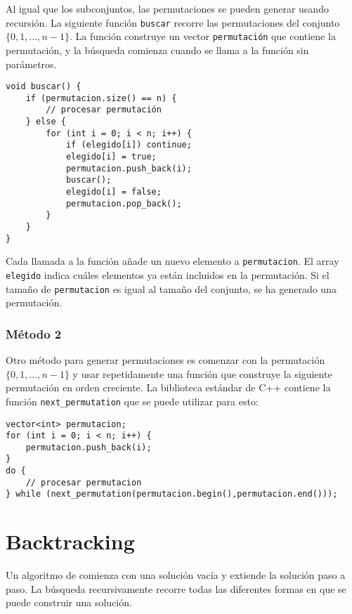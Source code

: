 Al igual que los subconjuntos, las permutaciones se pueden generar
usando recursión.
La siguiente función \texttt{buscar} recorre
las permutaciones del conjunto $\{0,1,\ldots,n-1\}$.
La función construye un vector \texttt{permutación}
que contiene la permutación,
y la búsqueda comienza cuando se llama a la función
sin parámetros.

\begin{lstlisting}
void buscar() {
    if (permutacion.size() == n) {
        // procesar permutación
    } else {
        for (int i = 0; i < n; i++) {
            if (elegido[i]) continue;
            elegido[i] = true;
            permutacion.push_back(i);
            buscar();
            elegido[i] = false;
            permutacion.pop_back();
        }
    }
}
\end{lstlisting}

Cada llamada a la función añade un nuevo elemento a
\texttt{permutacion}.
El array \texttt{elegido} indica cuáles
elementos ya están incluidos en la permutación.
Si el tamaño de \texttt{permutacion} es igual al tamaño del conjunto,
se ha generado una permutación.

\subsubsection{Método 2}


Otro método para generar permutaciones
es comenzar con la permutación
$\{0,1,\ldots,n-1\}$ y usar repetidamente
una función que construye la siguiente permutación
en orden creciente.
La biblioteca estándar de C++ contiene la función
\texttt{next\_permutation} que se puede utilizar para esto:

\begin{lstlisting}
vector<int> permutacion;
for (int i = 0; i < n; i++) {
    permutacion.push_back(i);
}
do {
    // procesar permutacion
} while (next_permutation(permutacion.begin(),permutacion.end()));
\end{lstlisting}

\section{Backtracking}


Un algoritmo de 
comienza con una solución vacía
y extiende la solución paso a paso.
La búsqueda recursivamente
recorre todas las diferentes formas en que
se puede construir una solución.

